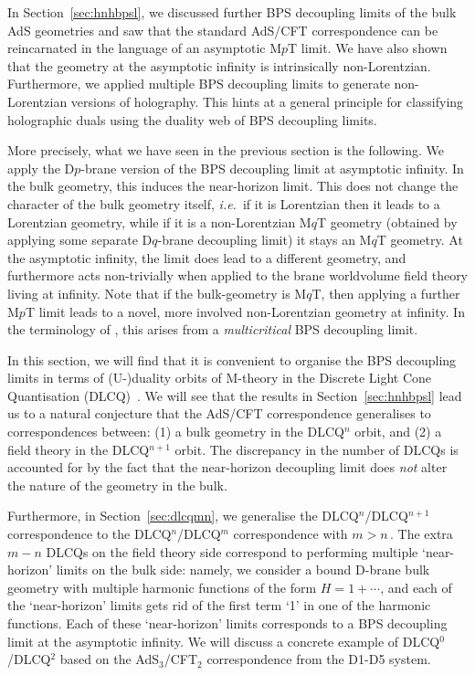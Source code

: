 \documentclass[11pt]{article}
\renewcommand{\emph}[1]{\textit{#1}}
\begin{document}
In Section~\ref{sec:hnhbpsl}, we discussed further BPS decoupling limits of the bulk AdS geometries and saw that the standard AdS/CFT correspondence can be reincarnated in the language of an asymptotic M$p$T limit. We have also shown that the geometry at the asymptotic infinity is intrinsically non-Lorentzian.
Furthermore, we applied multiple BPS decoupling limits to generate non-Lorentzian versions of holography. 
This hints at a general principle for classifying holographic duals using the duality web of BPS decoupling limits. 

More precisely, what we have seen in the previous section is the following. 
We apply the D$p$-brane version of the BPS decoupling limit at asymptotic infinity. 
In the bulk geometry, this induces the near-horizon limit. This does not change the character of the bulk geometry itself, \emph{i.e.}~if it is Lorentzian then it leads to a Lorentzian geometry, while if it is a non-Lorentzian M$q$T geometry (obtained by applying some separate D$q$-brane decoupling limit) it stays an M$q$T geometry.
At the asymptotic infinity, the limit does lead to a different geometry, and furthermore acts non-trivially when applied to the brane worldvolume field theory living at infinity.
Note that if the bulk-geometry is M$q$T, then applying a further M$p$T limit leads to a novel, more involved non-Lorentzian geometry at infinity. 
In the terminology of \cite{Blair:2023noj}, this arises from a \emph{multicritical} BPS decoupling limit.

In this section, we will find that it is convenient to organise the BPS decoupling limits in terms of (U-)duality orbits of M-theory in the Discrete Light Cone Quantisation (DLCQ)~\cite{Blair:2023noj, Gomis:2023eav, bpslimits}. We will see that the results in Section~\ref{sec:hnhbpsl} lead us to a natural conjecture that the AdS/CFT correspondence generalises to correspondences between: (1) a bulk geometry in the DLCQ${}^n$ orbit, and (2) a field theory in the DLCQ${}^{n+1}$ orbit. The discrepancy in the number of DLCQs is accounted for by the fact that the near-horizon decoupling limit does \emph{not} alter the nature of the geometry in the bulk. 

Furthermore, in Section~\ref{sec:dlcqmn}, we generalise the DLCQ${}^n$/DLCQ${}^{n+1}$ correspondence to the DLCQ${}^n$/DLCQ${}^m$ correspondence with $m > n$\,. The extra $m - n$ DLCQs on the field theory side correspond to performing multiple `near-horizon' limits on the bulk side: namely, we consider a bound D-brane
bulk geometry with multiple harmonic functions of the form $H = 1 + \cdots$, and each of the `near-horizon' limits gets rid of the first term `1' in one of the harmonic functions. Each of these `near-horizon' limits corresponds to a BPS decoupling limit at the asymptotic infinity. We will discuss a concrete example of DLCQ${}^0$/DLCQ${}^2$ based on the AdS${}_3$/CFT${}_2$ correspondence from the D1-D5 system. 
\end{document}
